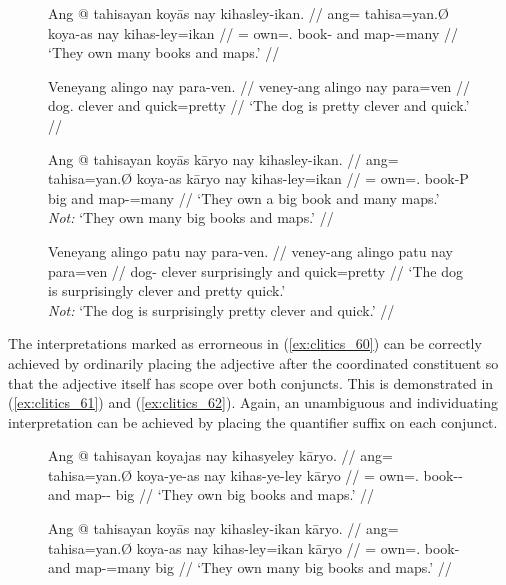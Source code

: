 \begin{figure}
\pex\label{ex:clitics_59}
\a\label{ex:clitics_59a}\begingl
	\gla Ang @ tahisayan koyās nay kihasley-ikan. //
	\glb ang= tahisa=yan.Ø koya-as nay kihas-ley=ikan //
	\glc \AgtT{}= own=\TplM{}.\Top{} book-\Parg{} and map-\PargI{}=many //
	\glft `They own many books and maps.' //
\endgl

\a\label{ex:clitics_59b}\begingl
	\gla Veneyang alingo nay para-ven. //
	\glb veney-ang alingo nay para=ven //
	\glc dog.\Aarg{} clever and quick=pretty //
	\glft `The dog is pretty clever and quick.' //
\endgl
\xe
\end{figure}

\begin{figure}
\pex\label{ex:clitics_60}
\a\label{ex:clitics_60a}\begingl
	\gla Ang @ tahisayan koyās kāryo nay kihasley-ikan. //
	\glb ang= tahisa=yan.Ø koya-as kāryo nay kihas-ley=ikan //
	\glc \AgtT{}= own=\TplM{}.\Top{} book-P big and map-\PargI{}=many //
	\glft `They own a big book and many maps.' \\
		\textit{Not:} `They own many big books and maps.' //
\endgl

\a\label{ex:clitics_60b}\begingl
	\gla Veneyang alingo patu nay para-ven. //
	\glb veney-ang alingo patu nay para=ven //
	\glc dog-\Aarg{} clever surprisingly and quick=pretty //
	\glft `The dog is surprisingly clever and pretty quick.' \\
		\textit{Not:} `The dog is surprisingly pretty clever and quick.' //
\endgl
\xe
\end{figure}

The interpretations marked as errorneous in (\ref{ex:clitics_60}) can be
correctly achieved by ordinarily placing the adjective after the coordinated
constituent so that the adjective itself has scope over both conjuncts. This is
demonstrated in (\ref{ex:clitics_61}) and (\ref{ex:clitics_62}). Again, an
unambiguous and individuating interpretation can be achieved by placing the
quantifier suffix on each conjunct.

\begin{figure}
\pex\label{ex:clitics_61}
\a\label{ex:clitics_61a}\begingl
	\gla Ang @ tahisayan koyajas nay kihasyeley kāryo. //
	\glb ang= tahisa=yan.Ø koya-ye-as nay kihas-ye-ley kāryo //
	\glc \AgtT{}= own=\TplM{}.\Top{} book-\Pl{}-\Parg{} and map-\Pl{}-\PargI{}
		big //
	\glft `They own big books and maps.' //
\endgl

\a\label{ex:clitics_61b}\begingl
	\gla Ang @ tahisayan koyās nay kihasley-ikan kāryo. //
	\glb ang= tahisa=yan.Ø koya-as nay kihas-ley=ikan kāryo //
	\glc \AgtT{}= own=\TplM{}.\Top{} book-\Parg{} and map-\PargI{}=many 
		big //
	\glft `They own many big books and maps.' //
\endgl
\xe
\end{figure}

